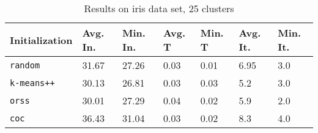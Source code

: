 \begin{table}[h]
	\begin{center}
		\begin{tabular}{|l|l|l|l|l|l|l|}
			\hline
			Initialization & Avg. In. & Min. In. & Avg. T & Min. T & Avg. It. & Min. It.\\\hline
			\texttt{random} & 31.67 & 27.26 & 0.03 & 0.01 & 6.95 & 3.0\\\hline
			\texttt{k-means++} & 30.13 & 26.81 & 0.03 & 0.03 & 5.2 & 3.0\\\hline
			\texttt{orss} & 30.01 & 27.29 & 0.04 & 0.02 & 5.9 & 2.0\\\hline
			\texttt{coc} & 36.43 & 31.04 & 0.03 & 0.02 & 8.3 & 4.0\\\hline
		\end{tabular}
		\caption{Results on iris data set, 25 clusters}
		\label{tbl:iris25}
	\end{center}
\end{table}

